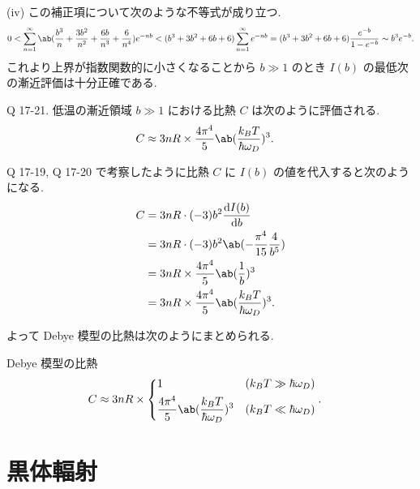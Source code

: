 \documentclass[uplatex,diffipdfmx,a4paper,11pt]{jlreq}
\theoremstyle{definition}
\begin{document}
(iv)
この補正項について次のような不等式が成り立つ.
\begin{align}
  0 < \sum_{n=1}^{\infty}\ab(\frac{b^3}{n} + \frac{3b^2}{n^2} + \frac{6b}{n^3} + \frac{6}{n^4})e^{-nb} < (b^3 + 3b^2 + 6b + 6)\sum_{n=1}^{\infty}e^{-nb} = (b^3 + 3b^2 + 6b + 6)\frac{e^{-b}}{1 - e^{-b}}\sim b^3e^{-b}.
\end{align}
これより上界が指数関数的に小さくなることから $b\gg 1$ のとき $I(b)$ の最低次の漸近評価は十分正確である.
\begin{itembox}[l]{Q 17-21.}
  低温の漸近領域 $b\gg 1$ における比熱 $C$ は次のように評価される.
  \begin{align}
    C & \approx 3nR\times\frac{4\pi^4}{5}\ab(\frac{k_BT}{\hbar\omega_D})^3.
  \end{align}
\end{itembox}
Q 17-19, Q 17-20 で考察したように比熱 $C$ に $I(b)$ の値を代入すると次のようになる.
\begin{align}
  C & = 3nR\cdot(-3)b^2\diff{I(b)}{b}                               \\
    & = 3nR\cdot(-3)b^2\ab(-\frac{\pi^4}{15}\frac{4}{b^5})          \\
    & = 3nR\times\frac{4\pi^4}{5}\ab(\frac{1}{b})^3                 \\
    & = 3nR\times\frac{4\pi^4}{5}\ab(\frac{k_BT}{\hbar\omega_D})^3.
\end{align}

よって Debye 模型の比熱は次のようにまとめられる.
\begin{itembox}[l]{Debye 模型の比熱}
  \begin{align}
    C & \approx 3nR\times\begin{dcases}
                           1                                                 & (k_BT\gg \hbar\omega_D) \\
                           \frac{4\pi^4}{5}\ab(\frac{k_BT}{\hbar\omega_D})^3 & (k_BT\ll \hbar\omega_D)
                         \end{dcases}.
  \end{align}
\end{itembox}

\section{黒体輻射}
\end{document}
